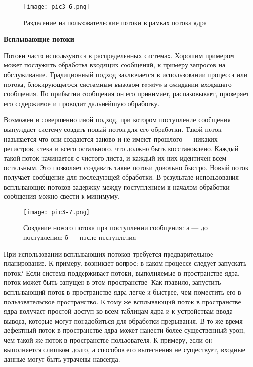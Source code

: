 \begin{figure}[!h]\center
   \texttt{[image: pic3-6.png]}
   \caption{Разделение на пользовательские потоки в рамках потока ядра}
\end{figure}

\textbf{Всплывающие потоки}

Потоки часто используются в распределенных системах. Хорошим примером может послужить обработка входящих сообщений, к примеру запросов на обслуживание. Традиционный подход заключается в использовании процесса или потока, блокирующегося системным вызовом receive в ожидании входящего сообщения. По прибытии сообщения он его принимает, распаковывает, проверяет его содержимое и проводит дальнейшую обработку.

Возможен и совершенно иной подход, при котором поступление сообщения вынуждает
систему создать новый поток для его обработки. Такой поток называется что они создаются заново и не имеют прошлого — никаких регистров, стека и всего остального, что должно быть восстановлено. Каждый такой поток начинается с чистого листа, и каждый их них идентичен всем остальным. Это позволяет создавать такие потоки довольно быстро. Новый поток получает сообщение для последующей обработки. В результате использования всплывающих потоков задержку между поступлением и началом обработки сообщения можно свести к минимуму.

\begin{figure}[!h]\center
   \texttt{[image: pic3-7.png]}
   \caption{Создание нового потока при поступлении сообщения:
      а — до поступления; б — после поступления}
\end{figure}

При использовании всплывающих потоков требуется предварительное планирование. К примеру, возникает вопрос: в каком процессе следует запускать поток? Если система поддерживает потоки, выполняемые в пространстве ядра, поток может быть запущен в этом пространстве. Как правило, запустить всплывающий поток в пространстве ядра легче и быстрее, чем поместить его в пользовательское пространство. К тому же всплывающий поток в пространстве ядра получает простой доступ ко всем таблицам ядра и к устройствам ввода-вывода, которые могут понадобиться для обработки прерывания. В то же время дефектный поток в пространстве ядра может нанести более существенный урон,
чем такой же поток в пространстве пользователя. К примеру, если он выполняется слишком долго, а способов его вытеснения не существует, входные данные могут быть утрачены навсегда.

